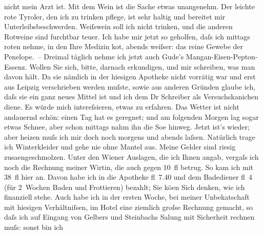 {\begin{ledgroupsized}[t]{13cm}
               nicht mein Arzt ist. Mit dem Wein ist die Sache etwas unangenehm. {\pb}Der leichte rote Tyroler, den ich zu trinken pflege,
               ist sehr \label{K_L00181_1v}\label{K_L00181_1h}haltig und
               bereitet mir Unterleibsbeschwerden. Weiſswein soll ich nicht trinken, und die anderen
               Rotweine sind furchtbar teuer. Ich habe mir jetzt so geholfen, daſs ich mittags roten
               nehme, in den Ihre Medizin ko{\geminationm}t, abends weiſser: das
               reine Gewebe der Penelope. – Dreimal täglich nehme ich jetzt auch Gude’s Mangan-Eisen-Pepton-Essenz. Wollen Sie sich, bitte, darnach
               erkundigen, und mir schreiben, was man davon hält. Da sie nämlich in der hiesigen
               Apotheke nicht vorrätig war und erst aus Leipzig
               verschrieben werden muſste, sowie aus anderen Gründen glaube ich, daſs sie ein ganz
               neues Mittel ist und ich dem Dr Schreiber als
               Versuchskanichen diene. Es würde mich intereſsieren, etwas zu erfahren.\pend
           \pstart
           Das Wetter ist nicht andauernd schön: einen Tag hat es geregnet; und am folgenden
               Morgen lag sogar etwas Schnee, aber schon mittags nahm ihn die So{\geminationn}e hinweg. Jetzt ist’s wieder; aber heizen muſs ich mir
               doch noch morgens und abends laſsen. Natürlich trage ich Winterkleider und gehe nie
               ohne Mantel aus.\pend
           \pstart
           Meine Gelder sind riesig zusa{\geminationm}engeschmolzen. Unter den
                  Wiener Auslagen, die ich Ihnen angab, vergaſs {\pb}ich noch die Rechnung meiner Wirtin, die auch gegen 10 fl betrug. So kam
               ich mit 38 fl hier an. Davon habe ich in die Apotheke fl 7.40 und dem Badediener fl 4
               (für 2 Wochen Baden und Frottieren) bezahlt; Sie kö{\geminationn}en
               Sich denken, wie ich finanziell stehe. Auch habe ich in der ersten Woche, bei meiner
                  Unbeka{\geminationn}tschaft mit hiesigen Verhältniſsen, im Hotel
               eine ziemlich groſse Rechnung gemacht, so daſs ich auf Eingang von Gelbers und Steinbachs Sa{\geminationm}lung mit Sicherheit rechnen muſs: sonst bin ich

\end{ledgroupsized}}
